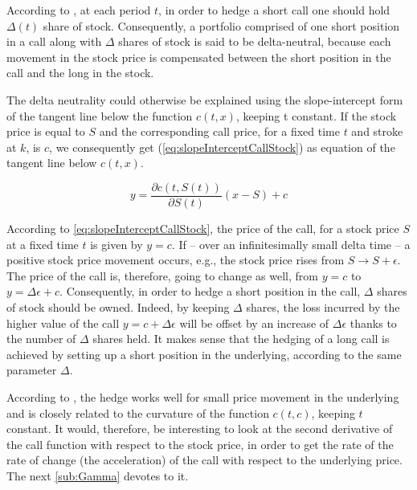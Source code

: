 \documentclass[12pt,a4paper]{report}
\newcommand{\call}[2]{c\left( #1, #2\right)}
\newcommand{\St}{S\left(t\right)}
\begin{document}
According to \citet{hull}, at each period $t$, in order to hedge a short call one should hold $\Delta(t)$ share of stock. 
Consequently, a portfolio comprised of one short position in a call along with $\Delta$ shares of stock is said to be delta-neutral, because each movement in the stock price is compensated between the short position in the call and the long in the stock.

The delta neutrality could otherwise be explained using the slope-intercept form of the tangent line below the function $\call{t}{x}$, keeping t constant. If the stock price is equal to $S$ and the corresponding call price, for a fixed time $t$ and stroke at $k$, is $c$, we consequently get (\ref{eq:slopeInterceptCallStock}) as equation of the tangent line below $\call{t}{x}$.
\begin{center}
  \begin{equation}
       y  =  \frac{\partial \call{t}{\St}}{\partial \St}  ( x - S) + c
       \label{eq:slopeInterceptCallStock}
  \end{equation}
\end{center}
According to \ref{eq:slopeInterceptCallStock}, the price of the call, for a stock price $S$ at a fixed time $t$ is given by $y = c$.
If -- over an infinitesimally small delta time -- a positive stock price movement occurs, e.g., the stock price rises from $S \to S + \epsilon$. The price of the call is, therefore, going to change as well, from $y = c$ to $y = \Delta \epsilon + c$.
Consequently, in order to hedge a short position in the call, $\Delta$ shares of stock should be owned. Indeed, by keeping $\Delta$ shares, the loss incurred by the higher value of the call $y = c + \Delta \epsilon$ will be offset by an increase of $\Delta \epsilon$ thanks to the number of $\Delta$ shares held.
It makes sense that the hedging of a long call is achieved by setting up a short position in the underlying, according to the same parameter $\Delta$.

According to \citet{shreve}, the hedge works well for small price movement in the underlying and is closely related to the curvature of the function $\call{t}{c}$, keeping $t$ constant.
It would, therefore, be interesting to look at the second derivative of the call function with respect to the stock price, in order to get the rate of the rate of change (the acceleration) of the call with respect to the underlying price.
The next \cref{sub:Gamma} devotes to it.


\end{document}
